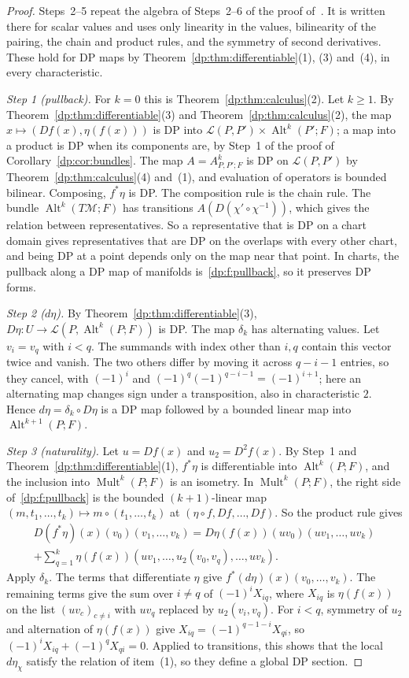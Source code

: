 \documentclass[11pt]{amsart}
\theoremstyle{definition}
\theoremstyle{remark}
\numberwithin{equation}{section}
\newcommand{\cL}{\mathcal L}
\newcommand{\Alt}{\operatorname{Alt}}
\newcommand{\Mult}{\operatorname{Mult}}
\theoremstyle{plain}
\theoremstyle{definition}
\theoremstyle{plain}
\newcommand{\cM}{\mathcal M}
\begin{document}
\begin{proof}
Steps~2--5 repeat the algebra of Steps~2--6 of the proof of~\cite[Theorem~10.7]{I}. It is written there for scalar values and uses only linearity in the values, bilinearity of the pairing, the chain and product rules, and the symmetry of second derivatives. These hold for DP maps by Theorem~\ref{dp:thm:differentiable}(1), (3) and~(4), in every characteristic.

\emph{Step 1 (pullback).} For $k=0$ this is Theorem~\ref{dp:thm:calculus}(2). Let $k\ge1$. By Theorem~\ref{dp:thm:differentiable}(3) and Theorem~\ref{dp:thm:calculus}(2), the map $x\mapsto(Df(x),\eta(f(x)))$ is DP into $\cL(P,P')\times\Alt^k(P';F)$; a map into a product is DP when its components are, by Step~1 of the proof of Corollary~\ref{dp:cor:bundles}. The map $A=A^k_{P,P';F}$ is DP on $\cL(P,P')$ by Theorem~\ref{dp:thm:calculus}(4) and~(1), and evaluation of operators is bounded bilinear. Composing, $f^*\eta$ is DP. The composition rule is the chain rule. The bundle $\Alt^k(T\cM;F)$ has transitions $A(D(\chi'\circ\chi^{-1}))$, which gives the relation between representatives. So a representative that is DP on a chart domain gives representatives that are DP on the overlaps with every other chart, and being DP at a point depends only on the map near that point. In charts, the pullback along a DP map of manifolds is~\eqref{dp:f:pullback}, so it preserves DP forms.

\emph{Step 2 ($d\eta$).} By Theorem~\ref{dp:thm:differentiable}(3), $D\eta\colon U\to\cL(P,\Alt^k(P;F))$ is DP. The map $\delta_k$ has alternating values. Let $v_i=v_q$ with $i<q$. The summands with index other than $i,q$ contain this vector twice and vanish. The two others differ by moving it across $q-i-1$ entries, so they cancel, with $(-1)^i$ and $(-1)^q(-1)^{q-i-1}=(-1)^{i+1}$; here an alternating map changes sign under a transposition, also in characteristic $2$. Hence $d\eta=\delta_k\circ D\eta$ is a DP map followed by a bounded linear map into $\Alt^{k+1}(P;F)$.

\emph{Step 3 (naturality).} Let $u=Df(x)$ and $u_2=D^2f(x)$. By Step~1 and Theorem~\ref{dp:thm:differentiable}(1), $f^*\eta$ is differentiable into $\Alt^k(P;F)$, and the inclusion into $\Mult^k(P;F)$ is an isometry. In $\Mult^k(P;F)$, the right side of~\eqref{dp:f:pullback} is the bounded $(k+1)$\nobreakdash-linear map $(m,t_1,\dots,t_k)\mapsto m\circ(t_1,\dots,t_k)$ at $(\eta\circ f,Df,\dots,Df)$. So the product rule gives
\begin{multline*}
 D(f^*\eta)(x)(v_0)(v_1,\dots,v_k)=D\eta(f(x))(uv_0)(uv_1,\dots,uv_k)\\
 +\sum_{q=1}^k\eta(f(x))(uv_1,\dots,u_2(v_0,v_q),\dots,uv_k).
\end{multline*}
Apply $\delta_k$. The terms that differentiate $\eta$ give $f^*(d\eta)(x)(v_0,\dots,v_k)$. The remaining terms give the sum over $i\ne q$ of $(-1)^iX_{iq}$, where $X_{iq}$ is $\eta(f(x))$ on the list $(uv_c)_{c\ne i}$ with $uv_q$ replaced by $u_2(v_i,v_q)$. For $i<q$, symmetry of $u_2$ and alternation of $\eta(f(x))$ give $X_{iq}=(-1)^{q-1-i}X_{qi}$, so $(-1)^iX_{iq}+(-1)^qX_{qi}=0$. Applied to transitions, this shows that the local $d\eta_\chi$ satisfy the relation of item~(1), so they define a global DP section.


\end{proof}
\end{document}
